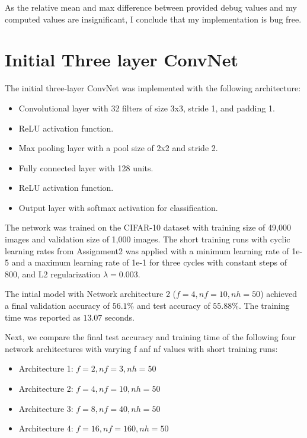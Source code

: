 \documentclass[11pt]{article}
\begin{document}
As the relative mean and max difference between provided debug values and my computed values are insignificant, I conclude that my implementation is bug free.

\section*{Initial Three layer ConvNet}

The initial three-layer ConvNet was implemented with the following architecture:
\begin{itemize}
  \item Convolutional layer with 32 filters of size 3x3, stride 1, and padding 1.
  \item ReLU activation function.
  \item Max pooling layer with a pool size of 2x2 and stride 2.
  \item Fully connected layer with 128 units.
  \item ReLU activation function.
  \item Output layer with softmax activation for classification.
\end{itemize}

The network was trained on the CIFAR-10 dataset with training size of 49,000 images and validation size of 1,000 images. The short training runs with cyclic learning rates from Assignment2 was applied with a minimum learning rate of 1e-5 and a maximum learning rate of 1e-1 for three cycles with constant steps of 800, and L2 regularization $\lambda = 0.003$.

The intial model with Network architecture 2 ($f=4, nf=10, nh=50$) achieved a final validation accuracy of $56.1\%$ and test accuracy of $55.88\%$. The training time was reported as $13.07$ seconds.

Next, we compare the final test accuracy and training time of the following four network architectures with varying f anf nf values with short training runs:

\begin{itemize}
  \item Architecture 1: $f=2, nf=3, nh=50$
  \item Architecture 2: $f=4, nf=10, nh=50$
  \item Architecture 3: $f=8, nf=40, nh=50$
  \item Architecture 4: $f=16, nf=160, nh=50$
\end{itemize}
\end{document}
